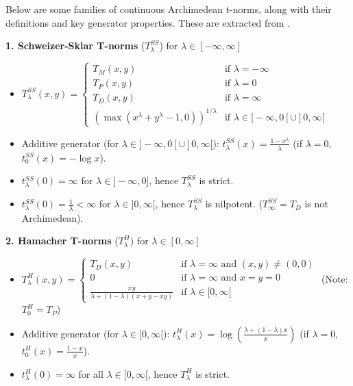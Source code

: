 \begin{example}\label{ex:families_tnorms}
    Below are some families of continuous Archimedean t-norms, along with their definitions and key generator properties. These are extracted from \cite[App.~A]{Klement2000}.

    \textbf{1. Schweizer-Sklar T-norms} ($T_\lambda^{SS}$) for $\lambda \in [-\infty, \infty]$ 
\begin{itemize}
    \item $T_\lambda^{SS}(x,y) = \begin{cases} T_M(x,y) & \text{if } \lambda = -\infty \\ T_P(x,y) & \text{if } \lambda = 0 \\ T_D(x,y) & \text{if } \lambda = \infty \\ (\max(x^\lambda + y^\lambda - 1, 0))^{1/\lambda} & \text{if } \lambda \in ]-\infty, 0[ \cup ]0, \infty[ \end{cases}$
    \item Additive generator (for $\lambda \in ]-\infty, 0[ \cup ]0, \infty[$): $t_\lambda^{SS}(x) = \frac{1-x^\lambda}{\lambda}$ (if $\lambda=0$, $t_0^{SS}(x) = -\log x$).
    \item $t_\lambda^{SS}(0) = \infty$ for $\lambda \in ]-\infty, 0]$, hence $T_\lambda^{SS}$ is strict.
    \item $t_\lambda^{SS}(0) = \frac{1}{\lambda} < \infty$ for $\lambda \in ]0, \infty[$, hence $T_\lambda^{SS}$ is nilpotent. ($T_\infty^{SS} = T_D$ is not Archimedean).
\end{itemize}

\textbf{2. Hamacher T-norms} ($T_\lambda^H$) for $\lambda \in [0, \infty]$ 
\begin{itemize}
    \item $T_\lambda^H(x,y) = \begin{cases} T_D(x,y) & \text{if } \lambda = \infty \text{ and } (x,y) \neq (0,0) \\ 0 & \text{if } \lambda = \infty \text{ and } x=y=0 \\ \frac{xy}{\lambda + (1-\lambda)(x+y-xy)} & \text{if } \lambda \in [0, \infty[ \end{cases}$
    (Note: $T_0^H = T_P$)
    \item Additive generator (for $\lambda \in [0, \infty[$): $t_\lambda^H(x) = \log\left(\frac{\lambda + (1-\lambda)x}{x}\right)$ (if $\lambda=0$, $t_0^H(x)=\frac{1-x}{x}$).
    \item $t_\lambda^H(0) = \infty$ for all $\lambda \in [0, \infty[$, hence $T_\lambda^H$ is strict.
\end{itemize}


\end{example}
